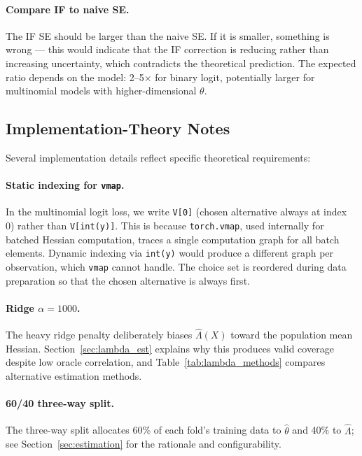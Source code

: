 \paragraph{Compare IF to naive SE.} The IF SE should be larger than the naive SE. If it is smaller, something is wrong --- this would indicate that the IF correction is reducing rather than increasing uncertainty, which contradicts the theoretical prediction. The expected ratio depends on the model: 2--5$\times$ for binary logit, potentially larger for multinomial models with higher-dimensional $\theta$.

\subsection{Implementation-Theory Notes}

Several implementation details reflect specific theoretical requirements:

\paragraph{Static indexing for \texttt{vmap}.} In the multinomial logit loss, we write \texttt{V[0]} (chosen alternative always at index 0) rather than \texttt{V[int(y)]}. This is because \texttt{torch.vmap}, used internally for batched Hessian computation, traces a single computation graph for all batch elements. Dynamic indexing via \texttt{int(y)} would produce a different graph per observation, which \texttt{vmap} cannot handle. The choice set is reordered during data preparation so that the chosen alternative is always first.

\paragraph{Ridge $\alpha = 1000$.} The heavy ridge penalty deliberately biases $\hat{\Lambda}(X)$ toward the population mean Hessian. Section~\ref{sec:lambda_est} explains why this produces valid coverage despite low oracle correlation, and Table~\ref{tab:lambda_methods} compares alternative estimation methods.

\paragraph{60/40 three-way split.} The three-way split allocates 60\% of each fold's training data to $\hat{\theta}$ and 40\% to $\hat{\Lambda}$; see Section~\ref{sec:estimation} for the rationale and configurability.

